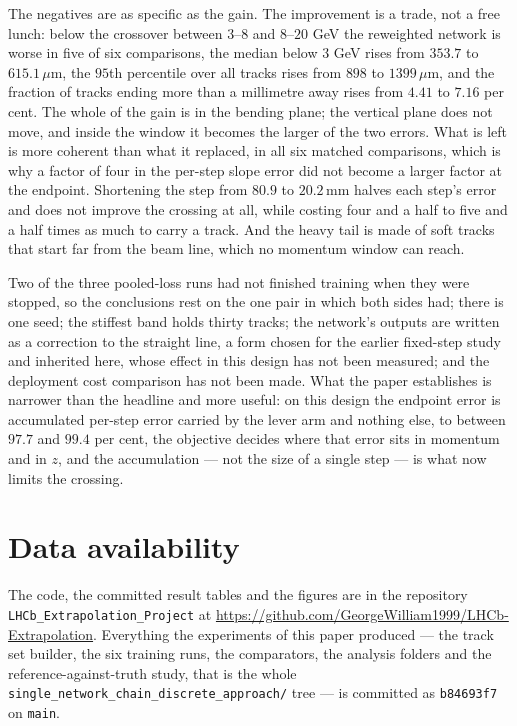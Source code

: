 \documentclass[11pt,a4paper]{article}
\newcommand{\um}{\ensuremath{\,\mu\mathrm{m}}}
\newcommand{\mm}{\ensuremath{\,\mathrm{mm}}}
\begin{document}
The negatives are as specific as the gain. The improvement is a trade, not a
free lunch: below the crossover between $3$--$8$ and $8$--$20$ GeV the
reweighted network is worse in five of six comparisons, the median below $3$ GeV
rises from $353.7$ to $615.1\um$, the $95$th percentile over all tracks rises
from $898$ to $1399\um$, and the fraction of tracks ending more than a
millimetre away rises from $4.41$ to $7.16$ per cent. The whole of the gain is
in the bending plane; the vertical plane does not move, and inside the window it
becomes the larger of the two errors. What is left is more coherent than what it
replaced, in all six matched comparisons, which is why a factor of four in the
per-step slope error did not become a larger factor at the endpoint. Shortening
the step from $80.9$ to $20.2\mm$ halves each step's error and does not improve
the crossing at all, while costing four and a half to five and a half times as
much to carry a track. And the heavy tail is made of soft tracks that start far
from the beam line, which no momentum window can reach.

Two of the three pooled-loss runs had not finished training when they were
stopped, so the conclusions rest on the one pair in which both sides had; there
is one seed; the stiffest band holds thirty tracks; the network's outputs are
written as a correction to the straight line, a form chosen for the earlier
fixed-step study and inherited here, whose effect in this design has not been
measured; and the deployment cost
comparison has not been made. What the paper establishes is narrower than the
headline and more useful: on this design the endpoint error is accumulated
per-step error carried by the lever arm and nothing else, to between $97.7$ and
$99.4$ per cent, the objective decides where that error sits in momentum and in
$z$, and the accumulation --- not the size of a single step --- is what now
limits the crossing.

\section*{Data availability}

The code, the committed result tables and the figures are in the repository
\texttt{LHCb\_Extrapolation\_Project} at
\url{https://github.com/GeorgeWilliam1999/LHCb-Extrapolation}. Everything the
experiments of this paper produced --- the track set builder, the six training
runs, the comparators, the analysis folders and the reference-against-truth
study, that is the whole
\texttt{single\_network\_chain\_discrete\_approach/} tree --- is committed as
\texttt{b84693f7} on \texttt{main}.
\end{document}
